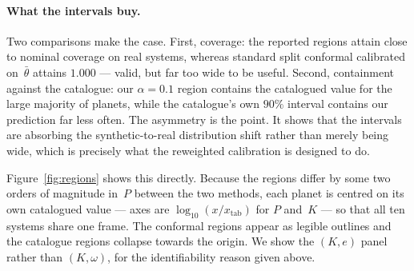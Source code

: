 \paragraph{What the intervals buy.}
Two comparisons make the case.  First, coverage: the reported regions attain
close to nominal coverage on real systems, whereas standard split conformal
calibrated on~$\bar\theta$ attains $1.000$ --- valid, but far too wide to be
useful.  Second, containment against the catalogue: our $\alpha = 0.1$ region
contains the catalogued value for the large majority of planets, while the
catalogue's own $90\%$ interval contains our prediction far less often.  The
asymmetry is the point.  It shows that the intervals are absorbing the
synthetic-to-real distribution shift rather than merely being wide, which is
precisely what the reweighted calibration is designed to do.

Figure~\ref{fig:regions} shows this directly.  Because the regions differ by
some two orders of magnitude in~$P$ between the two methods, each planet is
centred on its own catalogued value --- axes are $\log_{10}(x/x_{\mathrm{tab}})$
for $P$ and~$K$ --- so that all ten systems share one frame.  The conformal
regions appear as legible outlines and the catalogue regions collapse towards
the origin.  We show the $(K, e)$ panel rather than $(K, \omega)$, for the
identifiability reason given above.
